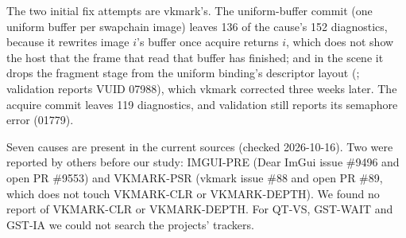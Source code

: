 \begin{table}[h]
\caption{The nine true causes with an upstream commit that changes the implicated pattern. Label: initial fix attempt
(re-run, leaves diagnostics of the cause) or commit changing the pattern (read, not re-run).}
\label{tab:s-provenance}
\scriptsize
{}
\end{table}

The two initial fix attempts are vkmark's. The uniform-buffer commit (one uniform buffer per swapchain
image) leaves 136 of the cause's 152 diagnostics, because it rewrites image $i$'s buffer once acquire returns $i$, which
does not show the host that the frame that read that buffer has finished; and in the  scene it drops the
fragment stage from the uniform binding's descriptor layout (; validation reports
VUID 07988), which vkmark corrected three weeks later. The acquire commit leaves 119
 diagnostics, and validation still reports its semaphore error (01779).

Seven causes are present in the current sources (checked 2026-10-16). Two were reported by others before our study:
IMGUI-PRE (Dear ImGui issue \#9496 and open PR \#9553) and VKMARK-PSR (vkmark issue \#88 and open PR \#89, which does
not touch VKMARK-CLR or VKMARK-DEPTH). We found no report of VKMARK-CLR or VKMARK-DEPTH. For QT-VS, GST-WAIT and
GST-IA we could not search the projects' trackers.

